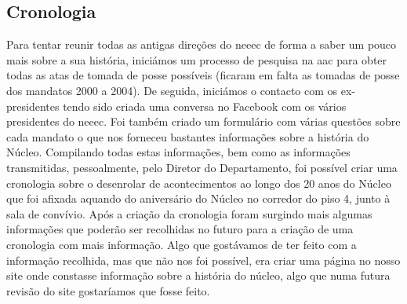 
\subsection{Cronologia}

Para tentar reunir todas as antigas direções do \acrshort{neeec} de forma a saber um pouco mais sobre a sua história, iniciámos um processo de pesquisa na \acrshort{aac} para obter todas as atas de tomada de posse possíveis (ficaram em falta as tomadas de posse dos mandatos 2000 a 2004). De seguida, iniciámos o contacto com os ex-presidentes tendo sido criada uma conversa no Facebook com os vários presidentes do \acrshort{neeec}. Foi também criado um formulário com várias questões sobre cada mandato o que nos forneceu bastantes informações sobre a história do Núcleo. Compilando todas estas informações, bem como as informações transmitidas, pessoalmente, pelo Diretor do Departamento, foi possível criar uma cronologia sobre o desenrolar de acontecimentos ao longo dos 20 anos do Núcleo que foi afixada aquando do aniversário do Núcleo no corredor do piso 4, junto à sala de convívio.
Após a criação da cronologia foram surgindo mais algumas informações que poderão ser recolhidas no futuro para a criação de uma cronologia com mais informação. Algo que gostávamos de ter feito com a informação recolhida, mas que não nos foi possível, era criar uma página no nosso site onde constasse informação sobre a história do núcleo, algo que numa futura revisão do site gostaríamos que fosse feito.